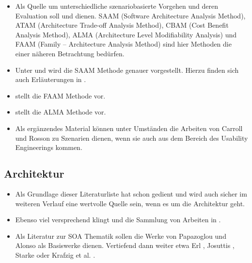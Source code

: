 \documentclass[12pt,headsepline,a4paper,bibtotoc,liststotoc,DIV12,BCOR12mm]{scrartcl}
\begin{document}
  \begin{itemize}
    \item Als Quelle um unterschiedliche szenariobasierte Vorgehen und deren Evaluation soll \citep{evaluating_software_architectures} und \citep{scenario_based_software_architecture_evaluation_methods} dienen. SAAM (Software Architecture Analysis Method), ATAM (Architecture Trade-off Analysis Method), CBAM (Cost Benefit Analysis Method), ALMA (Architecture Level Modifiability Analysis) und FAAM (Family – Architecture Analysis Method) sind hier Methoden die einer näheren Betrachtung bedürfen.
    \item Unter \citep{saam} und \citep{scenario_based_analysis_of_software_architecture} wird die SAAM Methode genauer vorgestellt. Hierzu finden sich auch Erläuterungen in \citep{handbuch_der_software_architektur}.
    \item \citep{faam} stellt die FAAM Methode vor.
    \item \citep{alma} stellt die ALMA Methode vor.
    \item Als ergänzendes Material können unter Umständen die Arbeiten von Carroll und Rosson zu Szenarien \citep{scenario_based_development,five_reasons_for_scenario_based_design} dienen, wenn sie auch aus dem Bereich des Usability Engineerings kommen.
  \end{itemize}


\subsection{Architektur} %
\label{sub:architektur}

  \begin{itemize}
    \item Als Grundlage dieser Literaturliste hat schon \citep{effektive_software_architekturen} gedient und wird auch sicher im weiteren Verlauf eine wertvolle Quelle sein, wenn es um die Architektur geht.
    \item Ebenso viel versprechend klingt \citep{software_architecture_in_practice} und die Sammlung von Arbeiten in \citep{handbuch_der_software_architektur}.
    \item Als Literatur zur SOA Thematik sollen die Werke von Papazoglou \citep{web_services_principles_and_technology} und Alonso \citep{web_services} als Basiswerke dienen. Vertiefend dann weiter etwa Erl \citep{soa}, Josuttis \citep{soa_in_practice}, Starke \citep{soa_expertenwissen} oder Krafzig et al. \citep{enterprise_soa}.
  \end{itemize}
\end{document}

